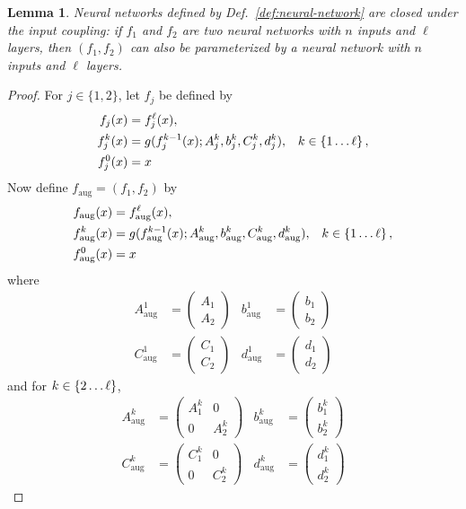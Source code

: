 \documentclass{article} %
\newtheorem{lemma}{Lemma}
\begin{document}
\begin{lemma}
  \label{lem:augmentation}
  Neural networks defined by Def.~\ref{def:neural-network} are closed under the input coupling:
  if \(f_1\) and \(f_2\) are two neural networks with \(n\) inputs and \(\ell\) layers, then \((f_1, f_2)\) can also be parameterized by a neural network with \(n\) inputs and \(\ell\) layers.
\end{lemma}
\begin{proof}
  For \(j \in \{1, 2\}\), let \(f_j\) be defined by
  \begin{align}
    f_j(x) &= f_j^\ell(x), \\
    f_j^k(x) &= g(f_j^{k-1}(x); A_j^k, b_j^k, C_j^k, d_j^k), & k \in \cbr{1 \ldots \ell},
    \\
    f_j^0(x) &= x
  \end{align}
  Now define \(f_\text{aug} =(f_1, f_2)\) by
  \begin{align}
    f_\text{aug}(x) &= f_\text{aug}^\ell(x), \\
    f_\text{aug}^k(x) &= g(f_\text{aug}^{k-1}(x); A_\text{aug}^k, b_\text{aug}^k, C_\text{aug}^k, d_\text{aug}^k), & k \in \cbr{1 \ldots \ell},
    \\
    f_\text{aug}^0(x) &= x
  \end{align}
  where
  \begin{align}
    A_\text{aug}^1 &= \begin{pmatrix}
      A_1 \\ A_2 
    \end{pmatrix}
    &
    b_\text{aug}^1 &= \begin{pmatrix}
      b_1 \\ b_2
    \end{pmatrix}
    \\
    C_\text{aug}^1 &= \begin{pmatrix}
      C_1 \\ C_2
    \end{pmatrix}
    &
    d_\text{aug}^1 &= \begin{pmatrix}
      d_1 \\ d_2
    \end{pmatrix}
  \end{align}
  and for \(k \in \cbr{2 \ldots \ell}\),
  \begin{align}
    A_\text{aug}^k &= \begin{pmatrix}
      A_1^k & 0 \\
      0 & A_2^k
    \end{pmatrix}
    &
    b_\text{aug}^k &= \begin{pmatrix}
      b_1^k \\ b_2^k
    \end{pmatrix}
    \\
    C_\text{aug}^k &= \begin{pmatrix}
      C_1^k & 0 \\
      0 & C_2^k
    \end{pmatrix}
    &
    d_\text{aug}^k &= \begin{pmatrix}
      d_1^k \\ d_2^k
    \end{pmatrix}
  \end{align}
\end{proof}
\end{document}

